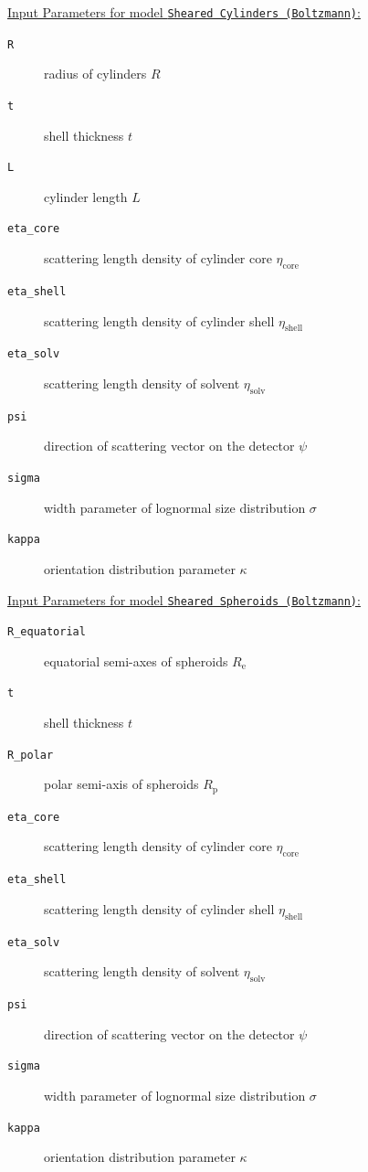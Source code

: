 \uline{Input Parameters for model \texttt{Sheared Cylinders (Boltzmann)}:}\\
\begin{description}
\item[\texttt{R}] radius of cylinders $R$
\item[\texttt{t}] shell thickness $t$
\item[\texttt{L}] cylinder length $L$
\item[\texttt{eta\_core}] scattering length density of cylinder core $\eta_\mathrm{core}$
\item[\texttt{eta\_shell}] scattering length density of cylinder shell $\eta_\mathrm{shell}$
\item[\texttt{eta\_solv}] scattering length density of solvent $\eta_\mathrm{solv}$
\item[\texttt{psi}] direction of scattering vector on the detector $\psi$
\item[{\texttt{sigma}}] width parameter of lognormal size distribution $\sigma$
\item[{\texttt{kappa}}] orientation distribution parameter $\kappa$
\end{description}

\vspace{5mm}

\uline{Input Parameters for model \texttt{Sheared Spheroids (Boltzmann)}:}\\
\begin{description}
\item[\texttt{R\_equatorial}] equatorial semi-axes of spheroids $R_\mathrm{e}$
\item[\texttt{t}] shell thickness $t$
\item[\texttt{R\_polar}] polar semi-axis of spheroids $R_\mathrm{p}$
\item[\texttt{eta\_core}] scattering length density of cylinder core $\eta_\mathrm{core}$
\item[\texttt{eta\_shell}] scattering length density of cylinder shell $\eta_\mathrm{shell}$
\item[\texttt{eta\_solv}] scattering length density of solvent $\eta_\mathrm{solv}$
\item[\texttt{psi}] direction of scattering vector on the detector $\psi$
\item[{\texttt{sigma}}] width parameter of lognormal size distribution $\sigma$
\item[{\texttt{kappa}}] orientation distribution parameter $\kappa$
\end{description}


